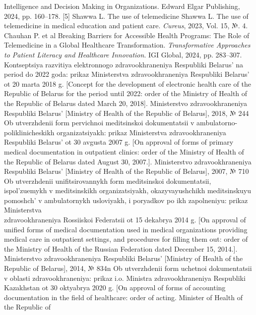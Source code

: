 \documentclass[10pt, a4paper]{article}
\begin{document}
\begin{multicols}{2}
\begin{thebibliography}{15}
{        Intelligence and Decision Making in Organizations}. Edward Elgar Publishing, 2024, pp. 160–178. [5] Shawwa L. The use of telemedicine
        \bibitem[5]{} Shawwa L. The use of telemedicine in medical education and patient care. \textit{Cureus}, 2023, Vol. 15, №. 4.
        \bibitem[6]{} Chauhan P. et al Breaking Barriers for Accessible Health Programs: The Role of Telemedicine in a Global Healthcare Transformation. \textit{Transformative Approaches to Patient Literacy and Healthcare Innovation}. IGI Global, 2024, pp. 283–307.
        \bibitem[7]{} Kontseptsiya razvitiya elektronnogo zdravookhraneniya Respubliki Belarus’ na period do 2022 goda: prikaz Ministerstva zdravookhraneniya Respubliki Belarus’ ot 20 marta 2018 g. [Concept for the development of electronic health care of the Republic of Belarus for the period until 2022: order of the Ministry of Health of the Republic of Belarus dated March 20, 2018]. Ministerstvo zdravookhraneniya Respubliki Belarus’ [Ministry of Health of the Republic of Belarus], 2018, № 244
        \bibitem[8]{} Ob utverzhdenii form pervichnoi meditsinskoi dokumentatsii v ambulatorno-poliklinicheskikh organizatsiyakh: prikaz Ministerstva zdravookhraneniya Respubliki Belarus’ ot 30 avgusta 2007 g. [On approval of forms of primary medical documentation in outpatient clinics: order of the Ministry of Health of the Republic of Belarus dated August 30, 2007.]. Ministerstvo zdravookhraneniya Respubliki Belarus’ [Ministry of Health of the Republic of Belarus], 2007, № 710
        \bibitem[9]{} Ob utverzhdenii unifitsirovannykh form meditsinskoi dokumentatsii, ispol’zuemykh v meditsinskikh organizatsiyakh, okazyvayushchikh meditsinskuyu pomoshch’ v ambulatornykh usloviyakh, i poryadkov po ikh zapolneniyu: prikaz Ministerstva 
        \\
        zdravookhraneniya Rossiiskoi Federatsii ot 15 dekabrya 2014 g. [On approval of unified forms of medical documentation used in medical organizations providing medical care in outpatient settings, and procedures for filling them out: order of the Ministry of Health of the Russian Federation dated December 15, 2014.]. Ministerstvo zdravookhraneniya Respubliki Belarus’ [Ministry of Health of the Republic of Belarus], 2014, № 834n
        \bibitem[10]{} Ob utverzhdenii form uchetnoi dokumentatsii v oblasti
        zdravookhraneniya: prikaz i.o. Ministra zdravookhraneniya
        Respubliki Kazakhstan ot 30 oktyabrya 2020 g. [On approval of
        forms of accounting documentation in the field of healthcare:
        order of acting. Minister of Health of the Republic of

\end{thebibliography}
\end{multicols}
\end{document}
